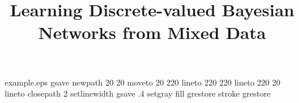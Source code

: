 %
%
%
%
%
\begin{filecontents*}{example.eps}
gsave
newpath
  20 20 moveto
  20 220 lineto
  220 220 lineto
  220 20 lineto
closepath
2 setlinewidth
gsave
  .4 setgray fill
grestore
stroke
grestore
\end{filecontents*}
%
\RequirePackage{fix-cm}
%
\documentclass[smallextended]{svjour3}       %
%
\smartqed  %
%
\usepackage{amsmath}
\usepackage{bm}
\usepackage{graphicx} %
\usepackage{epstopdf}
\usepackage{algorithm}
\usepackage[noend]{algpseudocode}
\usepackage[round]{natbib}
\usepackage{tikz}
\usetikzlibrary{bayesnet}
%
%
%
%
%


\title{Learning Discrete-valued Bayesian Networks from Mixed Data%
}


